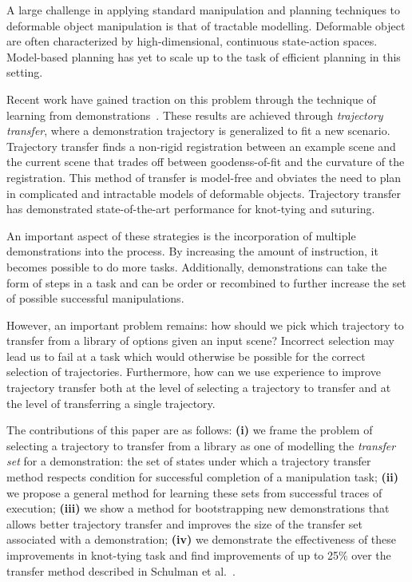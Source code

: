 A large challenge in applying standard manipulation and planning techniques to
deformable object manipulation is that of tractable modelling. Deformable object 
are often characterized by high-dimensional, continuous state-action spaces. Model-based 
planning has yet to scale up to the task of efficient planning in this
setting.

Recent work have gained traction on this problem through the technique of 
learning from demonstrations~\cite{Schulmanetal_ISRR2013,Schulmanetal_IROS2013}.
These results are achieved through \emph{trajectory transfer}, where a demonstration
trajectory is generalized to fit a new scenario. Trajectory transfer finds a non-rigid
registration between an example scene and the current scene that trades off between
goodenss-of-fit and the curvature of the registration. 
This method of transfer is model-free and obviates the need to plan in complicated
and intractable models of deformable objects. Trajectory transfer has demonstrated 
state-of-the-art performance for knot-tying and suturing.

An important aspect of these strategies is the incorporation of multiple demonstrations
into the process. By increasing the amount of instruction, it becomes possible to do more
tasks. Additionally, demonstrations can take the form of steps in a task and can be
order or recombined to further increase the set of possible successful manipulations.

However, an important problem remains: how should we pick which trajectory to transfer
from a library of options given an input scene? Incorrect selection may lead us
to fail at a task which would otherwise be possible for the correct selection of 
trajectories. Furthermore, how can we use experience to improve trajectory transfer 
both at the level of selecting a trajectory to transfer and at the level of transferring
a single trajectory.

The contributions of this paper are as follows: {\bf(i)} we frame the problem of selecting 
a trajectory to transfer from a library as one of modelling the \emph{transfer set} for a 
demonstration: the set of states under which a trajectory transfer method respects 
condition for successful completion of a manipulation task; {\bf(ii)} 
we propose a general method for learning these sets from successful traces of 
execution; {\bf(iii)} we show a method for bootstrapping new demonstrations
that allows better trajectory transfer and improves the size of the transfer set 
associated with a demonstration; {\bf(iv)} we demonstrate
the effectiveness of these improvements in knot-tying task and find improvements  
of up to 25\% over the transfer method described in Schulman et al.~\cite{Schulmanetal_ISRR2013}.



